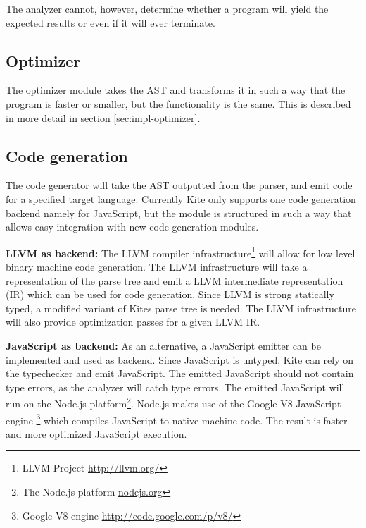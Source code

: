 The analyzer cannot, however, determine whether a program will yield the expected results or even if it will ever terminate.


\subsection{Optimizer}
The optimizer module takes the AST and transforms it in such a way that the program is faster or smaller, but the functionality is the same. This is described in more detail in section \ref{sec:impl-optimizer}.


\subsection{Code generation}
The code generator will take the AST outputted from the parser, and emit code for a specified target language. Currently Kite only supports one code generation backend namely for JavaScript, but the module is structured in such a way that allows easy integration with new code generation modules.

\textbf{LLVM as backend:} The LLVM compiler
infrastructure\footnote{LLVM Project \url{http://llvm.org/}} will allow
for low level binary machine code generation. The LLVM infrastructure
will take a representation of the parse tree and emit a LLVM
intermediate representation (IR) which can be used for code
generation. Since LLVM is strong statically typed, a modified variant
of Kites parse tree is needed. The LLVM infrastructure will also provide
optimization passes for a given LLVM IR.

\textbf{JavaScript as backend:} As an alternative, a JavaScript emitter
can be implemented and used as backend. Since JavaScript is untyped,
Kite can rely on the typechecker and emit JavaScript. The emitted
JavaScript should not contain type errors, as the analyzer will
catch type errors. The emitted JavaScript will run on the
Node.js platform\footnote{ The Node.js platform \url{nodejs.org}}.
Node.js makes use of the Google V8 JavaScript engine \footnote{Google
  V8 engine \url{http://code.google.com/p/v8/}} which compiles JavaScript to
native machine code. The result is faster and more optimized
JavaScript execution.

